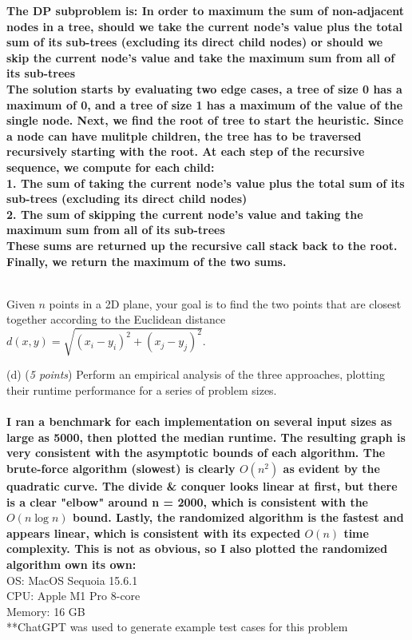 \documentclass{hw_template}
\begin{document}
\begin{problem}
\textbf{The DP subproblem is: In order to maximum the sum of non-adjacent nodes in a tree, should we
take the current node's value plus the total sum of its sub-trees (excluding its direct child nodes) or should we 
skip the current node's value and take the maximum sum from all of its sub-trees}\\

\textbf{The solution starts by evaluating two edge cases, a tree of size 0 has a maximum of 0, and a tree of size 1 has
a maximum of the value of the single node. Next, we find the root of tree to start the heuristic. Since a node can 
have mulitple children, the tree has to be traversed recursively starting with the root. At each step of the recursive sequence,
we compute for each child:}\\
\textbf{1. The sum of taking the current node's value plus the total sum of its sub-trees (excluding its direct child nodes)}\\
\textbf{2. The sum of skipping the current node's value and taking the maximum sum from all of its sub-trees}\\
\textbf{These sums are returned up the recursive call stack back to the root. Finally, we return the maximum of the two sums.}\\\\

\end{problem}

\newpage
\begin{problem}
Given $n$ points in a 2D plane, your goal is to find the two points that are closest
together according to the Euclidean distance
$d(x, y) = \sqrt{(x_i - y_i)^2 + (x_j - y_j)^2}$.


(d) (\textit{5 points})
Perform an empirical analysis of the three approaches, plotting their runtime
performance for a series of problem sizes. \\\\

\textbf{I ran a benchmark for each implementation on several input sizes as large as 5000, then 
plotted the median runtime. The resulting graph is very consistent with the asymptotic bounds of each algorithm. 
The brute-force algorithm (slowest) is clearly $O(n^2)$ as evident by the quadratic curve. The divide \& conquer looks 
linear at first, but there is a clear "elbow" around n = 2000, which is consistent with the $O(n \log n)$ bound. Lastly,
the randomized algorithm is the fastest and appears linear, which is consistent with its expected $O(n)$ time complexity. 
This is not as obvious, so I also plotted the randomized algorithm own its own:}\\


OS: MacOS Sequoia 15.6.1\\
CPU: Apple M1 Pro 8-core\\
Memory: 16 GB\\
**ChatGPT was used to generate example test cases for this problem\\
\\

\end{problem}
\end{document}
